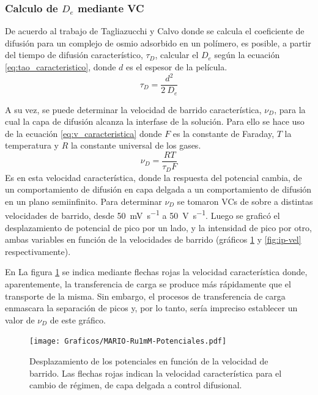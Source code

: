 	 \subsubsection*{Calculo de $D_e$ mediante VC}	
	 
	   	 De acuerdo al trabajo de Tagliazucchi y Calvo\cite{Tagliazucchi2010a} donde se calcula el coeficiente de difusión para un complejo de osmio adsorbido en un polímero, es posible, a partir del tiempo de difusión característico, $\tau_{\scriptscriptstyle{D}}$, calcular el $D_e$ según la ecuación \ref{eq:tao_caracteristico}, donde $d$ es el espesor de la película. 
	   		\begin{equation}
					\tau_{\scriptscriptstyle{D}}=\frac{d^2}{2\ D_e}
					\label{eq:tao_caracteristico}
			 \end{equation} 
  	  	  
  	  	  A su vez, se puede determinar la  velocidad de barrido característica, $\nu_{\scriptscriptstyle{D}}$, para la cual la capa de difusión alcanza la interfase de la solución. Para ello se hace uso de la ecuación \ref{eq:v_caracteristica} donde $F$ es la constante de Faraday, $T$ la temperatura y $R$ la constante universal de los gases.
	  	   	 \begin{equation}
					\nu_{\scriptscriptstyle{D}}=\frac{RT}{\tau_{\scriptscriptstyle{D}}F}
					\label{eq:v_caracteristica}
			 \end{equation}
	     \indent Es en esta velocidad característica, donde la respuesta del potencial cambia, de un comportamiento de difusión en capa delgada a un comportamiento de difusión en un plano semiinfinito. Para determinar $\nu_{\scriptscriptstyle{D}}$ se tomaron VCs de \ru\space sobre \pdmF\space a distintas velocidades de barrido, desde \SI{50}{\milli\volt\per\second} a \SI{50}{\volt\per\second}. Luego se graficó el desplazamiento de potencial de pico por un lado, y la intensidad de pico por otro, ambas variables en función de la velocidades de barrido (gráficos \ref{fig:corrimiento-potenciales} y \ref{fig:ip-vel} respectivamente).

	     En La figura \ref{fig:corrimiento-potenciales} se indica mediante flechas rojas la velocidad característica donde, aparentemente, la transferencia de carga se produce más rápidamente que el transporte de la misma. Sin embargo, el procesos de transferencia de carga enmascara la separación de picos y, por lo tanto, sería impreciso establecer un valor de $\nu_{\scriptscriptstyle{D}}$ de este gráfico.
			
			 \begin{figure}[ht]
					\centering
			 	    \texttt{[image: Graficos/MARIO-Ru1mM-Potenciales.pdf]}
			        \caption[Desplazamiento de potenciales]{Desplazamiento de los potenciales en función de la velocidad de barrido. Las flechas rojas indican la velocidad característica para el cambio de régimen, de capa delgada a control difusional.}
			        \label{fig:corrimiento-potenciales}
			      	\end{figure}
         
